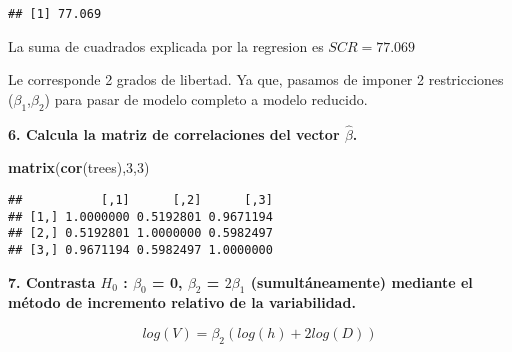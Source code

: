 \documentclass[]{article}
\newenvironment{Shaded}{\begin{snugshade}}{\end{snugshade}}
\newcommand{\KeywordTok}[1]{\textcolor[rgb]{0.13,0.29,0.53}{\textbf{{#1}}}}
\newcommand{\DecValTok}[1]{\textcolor[rgb]{0.00,0.00,0.81}{{#1}}}
\newcommand{\FloatTok}[1]{\textcolor[rgb]{0.00,0.00,0.81}{{#1}}}
\newcommand{\StringTok}[1]{\textcolor[rgb]{0.31,0.60,0.02}{{#1}}}
\newcommand{\CommentTok}[1]{\textcolor[rgb]{0.56,0.35,0.01}{\textit{{#1}}}}
\newcommand{\NormalTok}[1]{{#1}}
\begin{document}
\begin{Shaded}
\end{Shaded}

\begin{verbatim}
## [1] 77.069
\end{verbatim}

La suma de cuadrados explicada por la regresion es \(SCR = 77.069\)

Le corresponde 2 grados de libertad. Ya que, pasamos de imponer 2
restricciones (\(\beta_1\),\(\beta_2\)) para pasar de modelo completo a
modelo reducido.

\textbf{6. Calcula la matriz de correlaciones del vector
\(\hat{\beta}\).}

\begin{Shaded}
\begin{Highlighting}[]
\KeywordTok{matrix}\NormalTok{(}\KeywordTok{cor}\NormalTok{(trees),}\DecValTok{3}\NormalTok{,}\DecValTok{3}\NormalTok{)}
\end{Highlighting}
\end{Shaded}

\begin{verbatim}
##           [,1]      [,2]      [,3]
## [1,] 1.0000000 0.5192801 0.9671194
## [2,] 0.5192801 1.0000000 0.5982497
## [3,] 0.9671194 0.5982497 1.0000000
\end{verbatim}

\textbf{7. Contrasta \(H_0\) : \(\beta_0\) = 0, \(\beta_2\) =
\(2\beta_1\) (sumultáneamente) mediante el método de incremento relativo
de la variabilidad.}

\[ log(V) = \beta_2(log(h) + 2log(D)) \]
\end{document}
